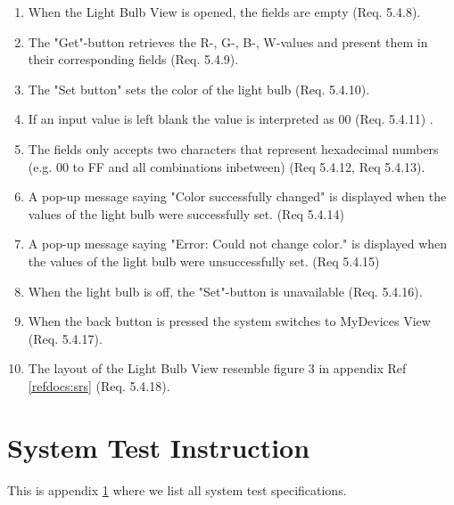 \documentclass[a4paper]{article}
\newlength{\testlabellength}
\newenvironment{testlist}{\begin{enumerate}[label=\bfseries Instruction \thesubsection.\arabic* , labelindent=0pt, labelwidth=\testlabellength , leftmargin=2cm]}{\end{enumerate}}
\begin{document}
\begin{appendices}
\begin{testlist}
    
	\item When the Light Bulb View is opened, the fields are empty (Req. 5.4.8).

	\item The "Get"-button retrieves the R-, G-, B-, W-values and present them in their corresponding fields (Req. 5.4.9). 

	\item The "Set button" sets the color of the light bulb (Req. 5.4.10).

	\item If an input value is left blank the value is interpreted as 00 (Req. 5.4.11) .   
    
    \item The fields only accepts two characters that represent hexadecimal numbers (e.g. 00 to FF and all combinations inbetween) (Req 5.4.12, Req 5.4.13).
    
    \item A pop-up message saying "Color successfully changed" is displayed when the values of the light bulb were successfully set. (Req 5.4.14)
    
    \item A pop-up message saying "Error: Could not change color." is displayed when the values of the light bulb were unsuccessfully set. (Req 5.4.15)
       
    \item When the light bulb is off, the "Set"-button is unavailable (Req. 5.4.16).
    
    \item When the back button is pressed the system switches to MyDevices View (Req. 5.4.17).
    
    \item The layout of the Light Bulb View resemble figure 3 in appendix  Ref \ref{refdocs:srs} (Req. 5.4.18).

\end{testlist}	

\newpage

\section{System Test Instruction} \label{appendix:section:systemtest}
This is appendix \ref{appendix:section:systemtest} where we list all system test specifications.


\end{appendices}
\end{document}

